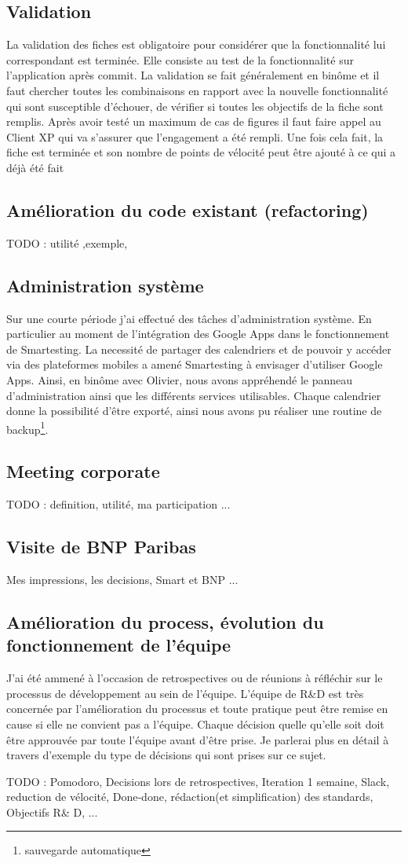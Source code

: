 \subsection{Validation}
La validation des fiches est obligatoire pour considérer que la fonctionnalité lui correspondant est terminée. Elle consiste au test de la fonctionnalité sur l'application après commit. La validation se fait généralement en binôme et il faut chercher toutes les combinaisons en rapport avec la nouvelle fonctionnalité qui sont susceptible d'échouer, de vérifier si toutes les objectifs de la fiche sont remplis. Après avoir testé un maximum de cas de figures il faut faire appel au Client XP qui va s'assurer que l'engagement a été rempli. Une fois cela fait, la fiche est terminée et son nombre de points de vélocité peut être ajouté à ce qui a déjà été fait
\subsection{Amélioration du code existant (refactoring)}
TODO : utilité ,exemple, 
\subsection{Administration système}
Sur une courte période j'ai effectué des t\^aches d'administration système. En particulier au moment de l'intégration des Google Apps dans le fonctionnement de Smartesting. La necessité de partager des calendriers et de pouvoir y accéder via des plateformes mobiles a amené Smartesting à envisager d'utiliser Google Apps. Ainsi, en binôme avec Olivier, nous avons appréhendé le panneau d'administration ainsi que les différents services utilisables. Chaque calendrier donne la possibilité d'être exporté, ainsi nous avons pu réaliser une routine de backup\footnote{sauvegarde automatique}.
\subsection{Meeting corporate}
TODO : definition, utilité, ma participation ...
\subsection{Visite de BNP Paribas}
Mes impressions, les decisions, Smart et BNP ...

\subsection{Amélioration du process, évolution du fonctionnement de l'équipe}
J'ai été ammené à l'occasion de retrospectives ou de réunions à réfléchir sur le processus de développement au sein de l'équipe. L'équipe de R\&D est très concernée par l'amélioration du processus et toute pratique peut être remise en cause si elle ne convient pas a l'équipe. Chaque décision quelle qu'elle soit doit être approuvée par toute l'équipe avant d'être prise. Je parlerai plus en détail à travers d'exemple du type de décisions qui sont prises sur ce sujet.



TODO : Pomodoro, Decisions lors de retrospectives, Iteration 1 semaine, Slack, reduction de vélocité, Done-done, rédaction(et simplification) des standards, Objectifs R\& D, ...